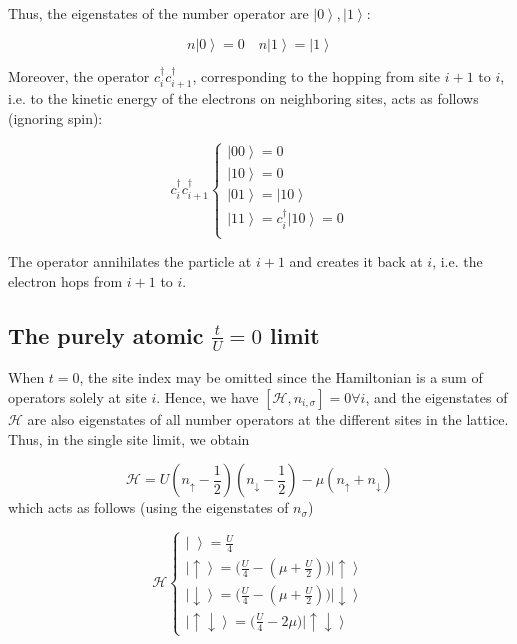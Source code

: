 Thus, the eigenstates of the number operator are $\left| 0 \right\rangle, \left| 1 \right\rangle$:

\begin{equation}
n \left| 0 \right\rangle = 0 \quad n \left| 1 \right\rangle = \left| 1 \right\rangle
\end{equation}

Moreover, the operator $c_i^\dagger c_{i+1}^\dagger$, corresponding to the hopping from site $i+1$ to $i$, i.e. to the kinetic energy of the electrons on neighboring sites, acts as follows (ignoring spin):

\begin{equation}
c_i^\dagger c_{i+1}^\dagger \begin{cases}
\left|0 0 \right\rangle = 0 \\
\left|1 0 \right\rangle =  0 \\
\left|0 1 \right\rangle =  \left| 1 0 \right\rangle \\
\left|1 1 \right\rangle =  c_i^\dagger \left| 1 0  \right\rangle = 0 \\
\end{cases}
\end{equation}

The operator annihilates the particle at $i+1$ and creates it back at $i$, i.e. the electron hops from $i+1$ to $i$.

\subsection{The purely atomic $\frac{t}{U} = 0$ limit}

When $t = 0$, the site index may be omitted since the Hamiltonian is a sum of operators solely at site $i$. Hence, we have $[ \mathcal{H}, n_{i,\sigma} ] = 0 \forall i $, and the eigenstates of $\mathcal{H}$ are also eigenstates of all number operators at the different sites in the lattice. Thus, in the single site limit, we obtain

\begin{equation}
\mathcal{H} = U (n_\uparrow - \frac{1}{2} ) (n_\downarrow - \frac{1}{2} ) - \mu ( n_\uparrow + n_\downarrow )
\end{equation}
which acts as follows (using the eigenstates of $n_\sigma$)

\begin{equation}
\mathcal{H} \begin{cases}
\left| \,\, \right\rangle = \frac{U}{4} \\
\left| \uparrow \right\rangle = \bigg( \frac{U}{4} - (\mu + \frac{U}{2} ) \bigg) \left| \uparrow \right\rangle \\
\left| \downarrow \right\rangle = \bigg( \frac{U}{4} - (\mu + \frac{U}{2} ) \bigg) \left| \downarrow \right\rangle \\
\left| \uparrow \downarrow \right\rangle = \bigg( \frac{U}{4} - 2 \mu \bigg) \left| \uparrow \downarrow \right\rangle
\end{cases}
\end{equation}

